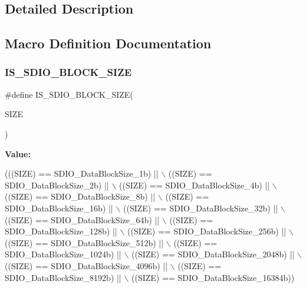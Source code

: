 \subsection{Detailed Description}


\subsection{Macro Definition Documentation}
\mbox{\label{group__SDIO__Data__Block__Size_ga25ce8d64134659c479d61aa681761948}} 
\subsubsection{I\+S\+\_\+\+S\+D\+I\+O\+\_\+\+B\+L\+O\+C\+K\+\_\+\+S\+I\+ZE}
{\footnotesize\ttfamily \#define I\+S\+\_\+\+S\+D\+I\+O\+\_\+\+B\+L\+O\+C\+K\+\_\+\+S\+I\+ZE(\begin{DoxyParamCaption}\item[{}]{S\+I\+ZE }\end{DoxyParamCaption})}

{\bfseries Value\+:}
\begin{DoxyCode}
(((SIZE) == SDIO_DataBlockSize_1b) || \(\backslash\)
                                  ((SIZE) == SDIO_DataBlockSize_2b) || \(\backslash\)
                                  ((SIZE) == SDIO_DataBlockSize_4b) || \(\backslash\)
                                  ((SIZE) == SDIO_DataBlockSize_8b) || \(\backslash\)
                                  ((SIZE) == SDIO_DataBlockSize_16b) || \(\backslash\)
                                  ((SIZE) == SDIO_DataBlockSize_32b) || \(\backslash\)
                                  ((SIZE) == SDIO_DataBlockSize_64b) || \(\backslash\)
                                  ((SIZE) == SDIO_DataBlockSize_128b) || \(\backslash\)
                                  ((SIZE) == SDIO_DataBlockSize_256b) || \(\backslash\)
                                  ((SIZE) == SDIO_DataBlockSize_512b) || \(\backslash\)
                                  ((SIZE) == SDIO_DataBlockSize_1024b) || \(\backslash\)
                                  ((SIZE) == SDIO_DataBlockSize_2048b) || \(\backslash\)
                                  ((SIZE) == SDIO_DataBlockSize_4096b) || \(\backslash\)
                                  ((SIZE) == SDIO_DataBlockSize_8192b) || \(\backslash\)
                                  ((SIZE) == SDIO_DataBlockSize_16384b))
\end{DoxyCode}


